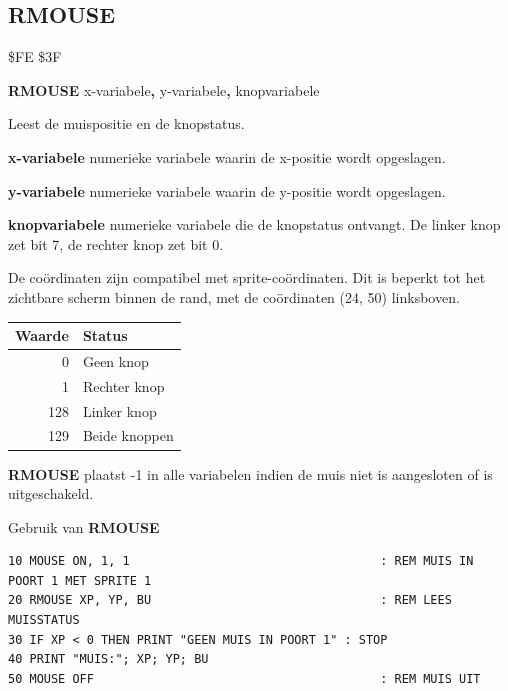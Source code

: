 \subsection{RMOUSE}
\begin{description}[leftmargin=2cm,style=nextline]
\item [Token:]    \$FE \$3F

\item [Formaat:]   {\bf RMOUSE} x-variabele{\bf,} y-variabele{\bf,} knopvariabele

\item [Gebruik:]    Leest de muispositie en de knopstatus.

                  {\bf x-variabele} numerieke variabele waarin de x-positie wordt opgeslagen.

                  {\bf y-variabele} numerieke variabele waarin de y-positie wordt opgeslagen.

                  {\bf knopvariabele} numerieke variabele die de knopstatus ontvangt. De linker knop zet bit 7, de rechter knop zet bit 0.

                  De coördinaten zijn compatibel met sprite-coördinaten. Dit is beperkt tot het zichtbare scherm binnen de rand, met de coördinaten (24, 50) linksboven.

                  \begin{center}
                  {\setlength{\tabcolsep}{1mm}
                  \begin{tabular}{|r|l|}
                  \hline
                  {\bf Waarde} & {\bf Status} \\
                  \hline
                  0   & Geen knop \\               1   & Rechter knop \\                  128 & Linker knop \\                  129 & Beide knoppen \\
                  \hline
                  \end{tabular}
                  }
                  \end{center}

\item [Opmerkingen:]  {\bf RMOUSE} plaatst -1 in alle variabelen indien de muis niet is aangesloten of is uitgeschakeld.

\item [Voorbeeld:]  Gebruik van {\bf RMOUSE}

\begin{tcolorbox}[colback=black,coltext=white]
\verbatimfont{\codefont}
\begin{verbatim}
10 MOUSE ON, 1, 1                                   : REM MUIS IN POORT 1 MET SPRITE 1
20 RMOUSE XP, YP, BU                                : REM LEES MUISSTATUS
30 IF XP < 0 THEN PRINT "GEEN MUIS IN POORT 1" : STOP
40 PRINT "MUIS:"; XP; YP; BU
50 MOUSE OFF                                        : REM MUIS UIT
\end{verbatim}
\end{tcolorbox}
\end{description}

